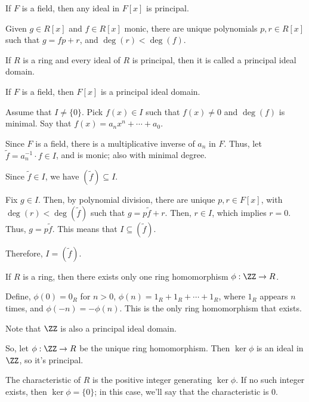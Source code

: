 \begin{prop}\label{prop:l18}
	If $F$ is a field, then any ideal in $F[x]$ is principal.
\end{prop}

\begin{alg}
	Given $g \in R[x]$ and $f \in R[x]$ monic, there are unique polynomials $p, r \in R[x]$ such that $g = fp + r$, and  $\deg(r) < \deg(f)$.
\end{alg}

\begin{defn}
	If $R$ is a ring and every ideal of $R$ is principal, then it is called a principal ideal domain.
\end{defn}

\begin{prop}
	If $F$ is a field, then $F[x]$ is a principal ideal domain.
\end{prop}
\begin{dem}
	Assume that $I \neq \{0\}$. Pick $f(x) \in I$ such that  $f(x) \neq 0$ and $\deg(f)$ is minimal. Say that $f(x) = a_nx^n + \cdots + a_0$.
	
	Since $F$ is a field, there is a multiplicative inverse of $a_n$ in $F$.
	Thus, let $\tilde f = a_n^{-1} \cdot f \in I$, and is monic; also with minimal degree.
	
	Since $\tilde f \in I$, we have $(\tilde f) \subseteq I$.

	Fix $g \in I$. Then, by polynomial division, there are unique $p, r \in F[x]$, with $\deg(r) < \deg(\tilde f)$ such that  $g = p\tilde f + r$. Then, $r \in I$, which implies  $r = 0$. Thus, $g = p\tilde f$.
	This means that  $I \subseteq (\tilde f)$.

	Therefore,  $I = (\tilde f)$.
\end{dem}

\begin{lem}
	If $R$ is a ring, then there exists only one ring homomorphism $\phi: \ZZ \to R$.
\end{lem}
\begin{dem}
	Define, $\phi(0) = 0_R$ for $n > 0$, $\phi(n) = 1_R + 1_R + \cdots + 1_R$, where $1_ R$ appears $n$ times, and $\phi(-n) = -\phi(n)$. This is the only ring homomorphism that exists.
\end{dem}

Note that $\ZZ$ is also a principal ideal domain.

So, let $\phi: \ZZ \to R$ be the unique ring homomorphism. Then $\ker\phi$ is an ideal in $\ZZ$, so it's principal.

\begin{defn}
	The characteristic of $R$ is the positive integer generating $\ker\phi$. If no such integer exists, then $\ker\phi = \{0\}$; in this case, we'll say that the characteristic is $0$.
\end{defn}
